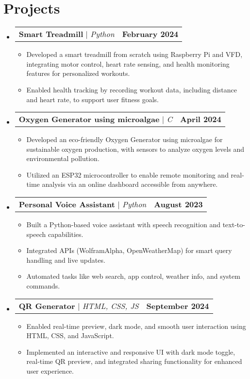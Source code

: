 \documentclass[letterpaper,11pt]{article}
\makeatletter
\newcommand{\resumeItem}[1]{
  \item\small{
    {#1 \vspace{-2pt}}
  }
}
\newcommand{\resumeProjectHeading}[2]{
    \item
    \begin{tabular*}{1.001\textwidth}{l@{\extracolsep{\fill}}r}
      \small#1 & \textbf{\small #2}\\
    \end{tabular*}\vspace{-7pt}
}
\newcommand{\resumeSubHeadingListStart}{\begin{itemize}[leftmargin=0.0in, label={}]}
\newcommand{\resumeSubHeadingListEnd}{\end{itemize}}
\newcommand{\resumeItemListStart}{\begin{itemize}}
\newcommand{\resumeItemListEnd}{\end{itemize}\vspace{-5pt}}
\makeatother
\begin{document}
\vspace{-15pt}
\section{Projects}
    \vspace{-7pt}
    \resumeSubHeadingListStart
    \resumeProjectHeading       
          {\textbf{Smart Treadmill} $|$ \emph{Python
  \href{http://github.com/Shubhangmishra5/vfd_modbus}{\faGithub} }} {February 2024}
          \resumeItemListStart
            \resumeItem{Developed a smart treadmill from scratch using Raspberry Pi and VFD, integrating motor control, heart rate sensing, and health monitoring
features for personalized workouts.}
            \resumeItem{Enabled health tracking by recording workout data, including distance and heart rate, to support user fitness goals.}
            
            
          \resumeItemListEnd 
          \vspace{-20pt}
    \resumeProjectHeading       
          {\textbf{Oxygen Generator using microalgae} $|$ \emph{C
  \href{shorturl.at/fqU7Z}{\faGithub} }} {April 2024}
          \resumeItemListStart
            \resumeItem{Developed an eco-friendly Oxygen Generator using microalgae for sustainable oxygen production, with sensors to analyze oxygen levels and
environmental pollution.
}
            \resumeItem{Utilized an ESP32 microcontroller to enable remote monitoring and real-time analysis via an online dashboard accessible from anywhere.
}
           
          \resumeItemListEnd 
          \vspace{-17pt}
      \resumeProjectHeading       
          {\textbf{Personal Voice Assistant} $|$ \emph{Python \href{https://github.com/Shubhangmishra5/voice_assistant}{\faGithub} }}{August 2023}
          \resumeItemListStart
            \resumeItem{Built a Python-based voice assistant with speech recognition and text-to-speech capabilities.}
            \resumeItem{Integrated APIs (WolframAlpha, OpenWeatherMap) for smart query handling and live updates.}
            \resumeItem{Automated tasks like web search, app control, weather info, and system commands.}
          \resumeItemListEnd 
          \vspace{-17pt}
      \resumeProjectHeading
          {\textbf{QR Generator} $|$ \emph{HTML, CSS, JS \href{https://github.com/Ishika2/Groovy}{\faGithub} }}{September 2024}
          \resumeItemListStart
            \resumeItem{Enabled real-time preview, dark mode, and smooth user interaction using HTML, CSS, and JavaScript.

}
            \resumeItem{Implemented an interactive and responsive UI with dark mode toggle, real-time QR preview, and integrated sharing functionality for enhanced user experience.}
          \resumeItemListEnd 
          \vspace{-13pt}
    \resumeSubHeadingListEnd
\end{document}

